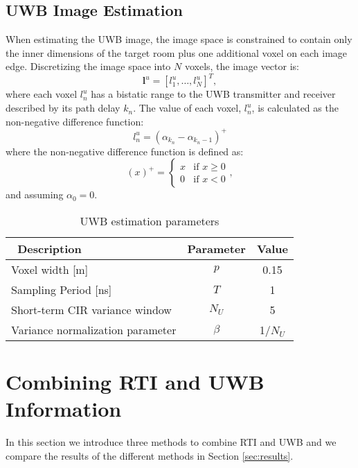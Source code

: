 \documentclass[conference]{IEEEtran}
\begin{document}
\subsection{UWB Image Estimation} \label{sec:uwb_image}

When estimating the UWB image, the image space is constrained to
contain only the inner dimensions of the target room plus one
additional voxel on each image edge. Discretizing the image space into
$N$ voxels, the image vector is:
\begin{equation}
  \mathbf{l}^u = [l^u_1, \ldots, l^u_N]^T,
\end{equation}
where each voxel $l^u_n$ has a bistatic range to the UWB transmitter
and receiver described by its path delay $k_n$. The value of each
voxel, $l^u_n$, is calculated as the non-negative difference function:
\begin{equation}
l^u_n = (\alpha_{k_n} - \alpha_{k_n -1})^{+}
\end{equation}
where the non-negative difference function is defined as:
\begin{equation}
(x)^{+} = 
   \begin{cases}
     x & \text{if } x \geq 0 \\
     0 & \text{if } x < 0
   \end{cases},
\end{equation}
and assuming $\alpha_0 = 0$.

\begin{table}[t!]
    \caption{UWB estimation parameters} \centering
        \footnotesize
        \begin{tabular}{l c c} \hline\hline\          Description & Parameter & Value \\
        \hline  Voxel width [m]                    & $p$          & 0.15  \\
        Sampling Period [ns]               & $T$          & 1 \\
        Short-term CIR variance window     & $N_U$        & 5 \\
        Variance normalization parameter   & $\beta$      & 1/$N_U$ \\
        \hline \end{tabular}
        \label{T:UWBImageParameters}
\end{table}



\section{Combining RTI and UWB Information} \label{sec:combining} In
this section we introduce three methods to combine RTI and UWB and we
compare the results of the different methods in Section
\ref{sec:results}.
\end{document}
